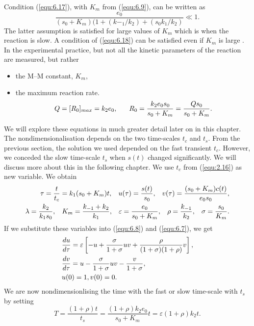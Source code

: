 \documentclass[a4paper]{report}
\theoremstyle{definition}
\begin{document}
Condition (\ref{equ:6.17}), with $K_m$ from (\ref{equ:6.9}), can be written as
 \begin{equation}
 \dfrac{e_0}{(s_0+K_m)(1+(k{-_1}/k_2)+(s_0k_1/k_2)}\ll1.
 \end{equation}
The latter assumption is satisfied for large values of $K_m$ which is when the reaction is slow. A condition of (\ref{equ:6.18}) can  be satisfied even if $K_m$ is large .
In the experimental practice, but not all the kinetic parameters of the reaction are measured, but rather
\begin{itemize}
\item{the M–M constant, $K_m$},
\item{the maximum reaction rate.
\begin{equation}
Q=[R_0]_{max}=k_2e_0, \hspace{6mm} 
R_0=\dfrac{k_2e_0s_0}{s_0+K_m}=\dfrac{Qs_0}{s_0+K_m}.
\end{equation}}
\end{itemize}
We will explore these equations in much greater detail later on in this chapter.
The nondimensionalisation depends on the two time-scales $t_c$ and $t_s$. From the previous section, the solution we used depended on the fast transient $t_c$. However, we conceded the slow time-scale $t_s$ when $s(t)$ changed significantly. We will discuss more about this in the following chapter.
We use $t_c$ from (\ref{equ:2.16}) as new variable. We obtain
\begin{align}
\label{equ:6.2}
\begin{split}
\tau=\dfrac{t}{t_c}=k_1(s_0+K_m)t, \hspace{3mm} u(\tau)=\dfrac{s(t)}{s_0},\hspace{3mm}  v(\tau)=\dfrac{(s_0+K_m)c(t)}{e_0s_0},
\\
\lambda=\dfrac{k_2}{k_1s_0}, \hspace{3mm} K_m=\dfrac{k_{-1}+k_2}{k_1}, \hspace{3mm} \varepsilon=\dfrac{e_0}{s_0+K_m}, \hspace{3mm} \rho=\dfrac{k_{-1}}{k_2}, \hspace{3mm} \sigma=\dfrac{s_0}{K_m}.
\end{split}
\end{align}
If we substitute these variables into (\ref{equ:6.8})
and (\ref{equ:6.7}), we get
\begin{align}
\label{equ:6.21}
\begin{split}
&\dfrac{du}{d\tau}=\varepsilon\left[-u+\dfrac{\sigma}{1+\sigma}uv+\dfrac{\rho}{(1+\sigma)(1+\rho)}v\right],
\\
&\dfrac{dv}{d\tau}=u-\dfrac{\sigma}{1+\sigma}uv-\dfrac{v}{1+\sigma},
\\
& u(0)=1,  \vspace{5mm}  v(0)=0.
\end{split}
\end{align}
We are now nondimensionlising the time with the fast or slow time-scale with $t_s$ by setting
\begin{equation}
\label{equ:6.22}
T=\dfrac{(1+\rho)t}{t_s}=\dfrac{(1+\rho)k_2e_0}{s_0+K_m}t=\varepsilon(1+\rho)k_2t.
\end{equation}
\end{document}

